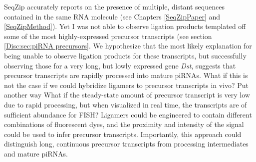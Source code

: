 
      



      
    
    SeqZip accurately reports on the presence of multiple, distant sequences contained in the same RNA molecule (see Chapters \ref{SeqZipPaper} and \ref{SeqZipMethod}). Yet I was not able to observe ligation products templated off some of the most highly-expressed precursor transcripts (see section \ref{Disc:sec:piRNA precursors}. We hypothesize that the most likely explanation for being unable to observe ligation products for these transcripts, but successfully observing those for a very long, but lowly expressed gene \textit{Dst}, suggests that precursor transcripts are rapidly processed into mature piRNAs. What if this is not the case if we could hybridize ligamers to precursor transcripts in vivo? Put another way \textemdash What if the steady-state amount of precursor transcript is very low due to rapid processing, but when visualized in real time, the transcripts are of sufficient abundance for FISH? Ligamers could be engineered to contain different combinations of fluorescent dyes, and the proximity and intensity of the signal could be used to infer precursor transcripts. Importantly, this approach could distinguish long, continuous precursor transcripts from processing intermediates and mature piRNAs.

